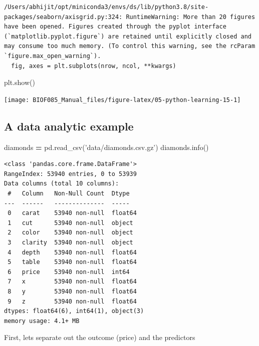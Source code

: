\documentclass[
  letterpaper,
]{scrbook}
\newenvironment{Shaded}{\begin{snugshade}}{\end{snugshade}}
\newcommand{\NormalTok}[1]{#1}
\newcommand{\OperatorTok}[1]{\textcolor[rgb]{0.81,0.36,0.00}{\textbf{#1}}}
\newcommand{\StringTok}[1]{\textcolor[rgb]{0.31,0.60,0.02}{#1}}
\begin{document}
\begin{verbatim}
/Users/abhijit/opt/miniconda3/envs/ds/lib/python3.8/site-packages/seaborn/axisgrid.py:324: RuntimeWarning: More than 20 figures have been opened. Figures created through the pyplot interface (`matplotlib.pyplot.figure`) are retained until explicitly closed and may consume too much memory. (To control this warning, see the rcParam `figure.max_open_warning`).
  fig, axes = plt.subplots(nrow, ncol, **kwargs)
\end{verbatim}

\begin{Shaded}
\begin{Highlighting}[]
\NormalTok{plt.show()}
\end{Highlighting}
\end{Shaded}

\begin{center}\texttt{[image: BIOF085\_Manual\_files/figure-latex/05-python-learning-15-1]} \end{center}

\hypertarget{a-data-analytic-example}{%
\subsection{A data analytic example}\label{a-data-analytic-example}}

\begin{Shaded}
\begin{Highlighting}[]
\NormalTok{diamonds }\OperatorTok{=}\NormalTok{ pd.read_csv(}\StringTok{'data/diamonds.csv.gz'}\NormalTok{)}
\NormalTok{diamonds.info()}
\end{Highlighting}
\end{Shaded}

\begin{verbatim}
<class 'pandas.core.frame.DataFrame'>
RangeIndex: 53940 entries, 0 to 53939
Data columns (total 10 columns):
 #   Column   Non-Null Count  Dtype  
---  ------   --------------  -----  
 0   carat    53940 non-null  float64
 1   cut      53940 non-null  object 
 2   color    53940 non-null  object 
 3   clarity  53940 non-null  object 
 4   depth    53940 non-null  float64
 5   table    53940 non-null  float64
 6   price    53940 non-null  int64  
 7   x        53940 non-null  float64
 8   y        53940 non-null  float64
 9   z        53940 non-null  float64
dtypes: float64(6), int64(1), object(3)
memory usage: 4.1+ MB
\end{verbatim}

First, lets separate out the outcome (price) and the predictors
\end{document}
